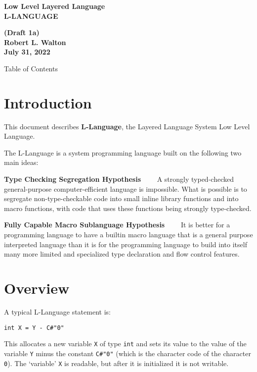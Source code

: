 \documentclass[12pt]{article}
\makeatletter
\renewcommand\tableofcontents{%
    \begin{list}{}%
	     {\setlength{\itemsep}{0in}%
	      \setlength{\topsep}{0in}%
	      \setlength{\parsep}{1ex}%
	      \setlength{\labelwidth}{0in}%
	      \setlength{\baselineskip}{1.5ex}%
	      \setlength{\leftmargin}{0.4in}%
	      \setlength{\rightmargin}{0.4in}}%
    \item\@starttoc{toc}%
    \end{list}}
\newcommand{\key}[1]{{\rm \bfseries #1}}
\newenvironment{indpar}[1][0.3in]%
	{\begin{list}{}%
		     {\setlength{\itemsep}{0in}%
		      \setlength{\topsep}{0in}%
		      \setlength{\parsep}{1ex}%
		      \setlength{\labelwidth}{#1}%
		      \setlength{\leftmargin}{#1}%
		      \addtolength{\leftmargin}{\labelsep}}%
	 \item}%
	{\end{list}}
\makeatother
\begin{document}
        
\begin{center}
\Large \bf
Low Level Layered Language\\[0.5ex]
\huge \bf
L-LANGUAGE
\end{center}
\begin{center}
\large \bf
(Draft 1a)
\\[0.5ex]
Robert L. Walton\\
July 31, 2022

\bigskip
 
Table of Contents
\end{center}

\bigskip

\tableofcontents 

\newpage

\section{Introduction}

This document describes \key{L-Language}, the Layered Language
System Low Level Language.

The L-Language is a system programming language built on the
following two main ideas:

\begin{indpar}

\key{Type Checking Segregation Hypothesis}~~~~ A strongly typed-checked
general-purpose computer-efficient language is impossible.
What is possible is
to segregate non-type-checkable code into small inline
library functions and into macro functions,
with code that uses these functions being
strongly type-checked.

\key{Fully Capable Macro Sublanguage Hypothesis}~~~~ It is better for
a programming language to have a builtin macro language that
is a general purpose interpreted language than it is for the
programming language to build into itself
many more limited and specialized type declaration and
flow control features.

\end{indpar}

\section{Overview}

A typical L-Language statement is:
\begin{indpar}\begin{verbatim}
int X = Y - C#"0"
\end{verbatim}\end{indpar}
This allocates a new variable {\tt X} of type {\tt int}
and sets its value to the value of the
variable {\tt Y} minus the constant {\tt C\#"0"} (which is
the character code of the character {\tt 0}).
The `variable' {\tt X} is readable, but after it is
initialized it is not writable.
\end{document}
